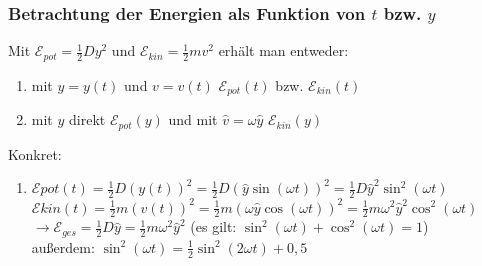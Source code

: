 \documentclass[a4paper]{scrartcl}
\begin{document}
\subsubsection{Betrachtung der Energien als Funktion von \(t\) bzw. \(y\)}
Mit \(\mathcal{E}_{pot} = \frac{1}{2}Dy^2\) und \(\mathcal{E}_{kin} =
\frac{1}{2}mv^2\) erhält man entweder:
\begin{enumerate}
	\item mit \(y=y(t)\) und \(v=v(t)\) \(\mathcal{E}_{pot}(t)\) bzw.
		\(\mathcal{E}_{kin}(t)\)
	\item mit \(y\) direkt \(\mathcal{E}_{pot}(y)\) und  mit \(\hat{v}=\omega
		\hat{y}\) \(\mathcal{E}_{kin}(y)\)
\end{enumerate}
Konkret:
\begin{enumerate}
	\item \(\mathcal{E}{pot}(t) = \frac{1}{2} D (y(t))^2 = \frac{1}{2} D
		(\hat{y} \sin(\omega t))^2 = \frac{1}{2} D \hat{y}^2 \sin^2(\omega t)\)
		\\
		\(\mathcal{E}{kin}(t) = \frac{1}{2} m (v(t))^2 = \frac{1}{2} m
		(\omega \hat{y} \cos(\omega t))^2 = \frac{1}{2} m \omega^2 \hat{y}^2
		\cos^2(\omega t)\)
		\(\longrightarrow \mathcal{E}_{ges} = \frac{1}{2} D \hat{y} =
		\frac{1}{2} m \omega^2 \hat{y}^2\) (es gilt: \(\sin^2(\omega t) +
		\cos^2(\omega t) = 1\))
		\\
		außerdem: \(\sin^2(\omega t) = \frac{1}{2} \sin^2 (2 \omega t) + 0,5\)
\end{enumerate}
\end{document}
